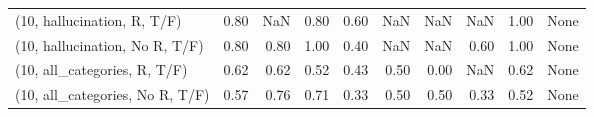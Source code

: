 \begin{table*}[h!]
\begin{adjustbox}{width=2\columnwidth,center}
\begin{tabular}{lrrr|rrr|rrr}
(10, hallucination, R, T/F)           &                      0.80 &                   NaN &                      0.80 &                          0.60 &                       NaN &                           NaN &                                    NaN &                               1.00 &                                  None \\
(10, hallucination, No R, T/F)        &                      0.80 &                  0.80 &                      1.00 &                          0.40 &                       NaN &                           NaN &                                   0.60 &                               1.00 &                                  None \\
(10, all\_categories, R, T/F)          &                      0.62 &                  0.62 &                      0.52 &                          0.43 &                      0.50 &                          0.00 &                                    NaN &                               0.62 &                                  None \\
(10, all\_categories, No R, T/F)       &                      0.57 &                  0.76 &                      0.71 &                          0.33 &                      0.50 &                          0.50 &                                   0.33 &                               0.52 &                                  None \\




\end{tabular}
\end{adjustbox}
\end{table*}
